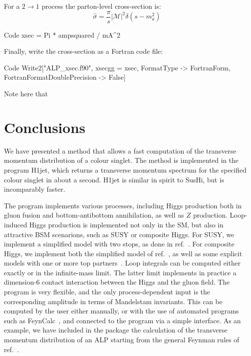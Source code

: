 \documentclass[12pt,a4wide]{article}
\begin{document}
For a $2 \rightarrow 1$ process the parton-level cross-section is: 
\begin{equation}
	\hat{\sigma} = \frac{\pi}{s} \left \vert \mathcal{M} \right \vert^2 \delta \left ( s - m_a^2 \right ) 
\end{equation}
\begin{mmaCell}{Code}
xsec = Pi * ampsquared / mA^2 
\end{mmaCell}
Finally, write the cross-section as a Fortran code file: 
\begin{mmaCell}{Code}
Write2["ALP_xsec.f90", xsecgg = xsec, FormatType -> FortranForm, FortranFormatDoublePrecision -> False] 
\end{mmaCell}
Note here that 


\section{Conclusions}
\label{sec:the-end}

We have presented a method that allows a fast computation of the
transverse momentum distribution of a colour singlet. The method is
implemented in the program H1jet, which returns a transverse momentum
spectrum for the specified colour singlet in about a second. H1jet is
similar in spirit to SusHi, but is incomparably faster.

The program implements various processes, including Higgs production
both in gluon fusion and bottom-antibottom annihilation, as well as
$Z$ production. Loop-induced Higgs production is implemented not only
in the SM, but also in attractive BSM scenarions, such as SUSY or
composite Higgs. For SUSY, we implement a simplified model with two
stops, as done in ref.~\cite{Banfi:2018pki}. For composite Higgs, we
implement both the simplified model of ref.~\cite{Banfi:2013yoa}, as
well as some explicit models with one or more top
partners~\cite{Banfi:2019xai}. Loop integrals can be computed either
exactly or in the infinite-mass limit. The latter limit implements in
practice a dimension-6 contact interaction between the Higgs and the
gluon field. The program is very flexible, and the only
process-dependent input is the corresponding amplitude in terms of
Mandelstam invariants. This can be computed by the user either
manually, or with the use of automated programs such as
FeynCalc~\cite{Shtabovenko:2020gxv}, and connected to the program via
a simple interface. As an example, we have included in the package the
calculation of the transverse momentum distribution of an ALP starting
from the general Feynman rules of ref.~\cite{Brivio:2017ije}.
\end{document}
